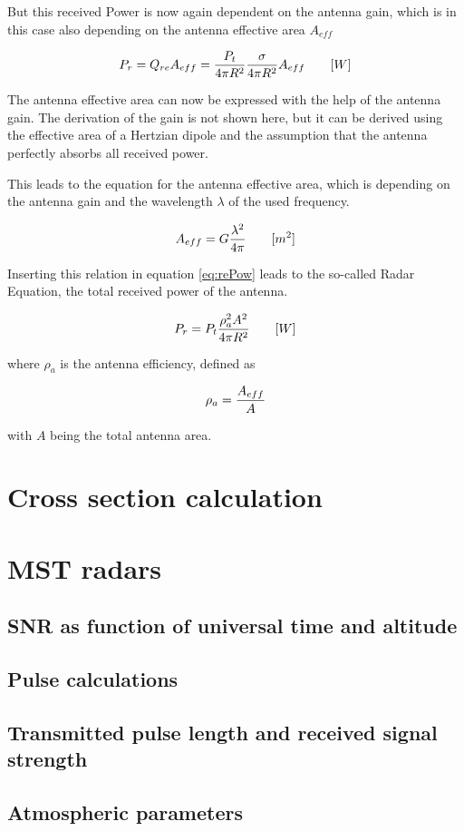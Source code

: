 But this received Power is now again dependent on the antenna gain, which is in this case also depending on the antenna effective area $A_{eff}$

\begin{equation}
\label{eq:rePow}
	\centering
	P_{r} = Q_{re} A_{eff} = \frac{P_t}{4 \pi R^2} \frac{\sigma}{4\pi R^2} A_{eff}\qquad [W]
\end{equation}

The antenna effective area can now be expressed with the help of the antenna gain. The derivation of the gain is not shown here, but it can be derived using the effective area of a Hertzian dipole and the assumption that the antenna perfectly absorbs all received power.\par
This leads to the equation for the antenna effective area, which is depending on the antenna gain and the wavelength $\lambda $ of the used frequency.

\begin{equation}
\label{eq:Aeff}
	\centering
	A_{eff} = G \frac{\lambda^2}{4\pi} \qquad [m^2]
\end{equation}

Inserting this relation in equation \ref{eq:rePow} leads to the so-called Radar Equation, the total received power of the antenna.

\begin{equation}
\label{eq:radEq}
	\centering
	P_{r} = P_t \frac{\rho_a^2 A^2 }{4 \pi R^2} \qquad [W]
\end{equation}

where $\rho_{a} $ is the antenna efficiency, defined as

\begin{equation}
\label{eq:radEq}
	\centering
	\rho_a = \frac{A_{eff}}{A}
\end{equation}

with $A$ being the total antenna area.

\section{Cross section calculation}



\section{MST radars}

\subsection{SNR as function of universal time and altitude}

\subsection{Pulse calculations}

\subsection{Transmitted pulse length and received signal strength}

\subsection{Atmospheric parameters}